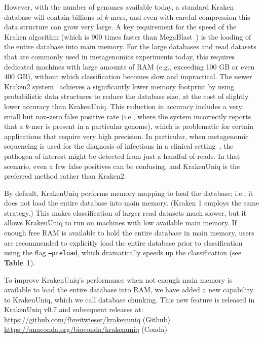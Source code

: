 \documentclass{article}
\def\code#1{\texttt{#1}}
\begin{document}
However, with the number of genomes available today, a standard Kraken database will contain billions of $k$-mers, and even with careful compression this data structure can grow very large. A key requirement for the speed of the Kraken algorithm (which is 900 times faster than MegaBlast~\cite{wood2014kraken}) is the loading of the entire database into main memory. For the large databases and read datasets that are commonly used in metagenomics experiments today, this requires dedicated machines with large amounts of RAM (e.g., exceeding 100 GB or even 400 GB), without which classification becomes slow and impractical. The newer Kraken2 system~\cite{wood2019improved} achieves a significantly lower memory footprint by using probabilistic data structures to reduce the database size, at the cost of slightly lower accuracy than KrakenUniq. This reduction in accuracy includes a very small but non-zero false positive rate (i.e., where the system incorrectly reports that a $k$-mer is present in a particular genome), which is problematic for certain applications that require very high precision. In particular, when metagenomic sequencing is used for the diagnosis of infections in a clinical setting~\cite{salzberg-pardo2016}, the pathogen of interest might be detected from just a handful of reads. In that scenario, even a few false positives can be confusing, and KrakenUniq is the preferred method rather than Kraken2.

By default, KrakenUniq performs memory mapping to load the database; i.e., it does not load the entire database into main memory. (Kraken 1 employs the same strategy.) This makes classification of larger read datasets much slower, but it allows KrakenUniq to run on machines with low available main memory. If enough free RAM is available to hold the entire database in main memory, users are recommended to explicitly load the entire database prior to classification using the flag \code{--preload}, which dramatically speeds up the classification (see \textbf{Table 1}).

To improve KrakenUniq's performance when not enough main memory is available to load the entire database into RAM, we have added a new capability to KrakenUniq, which we call database chunking. This new feature is released in KrakenUniq v0.7 and subsequent releases at:
\\
\url{https://github.com/fbreitwieser/krakenuniq} (Github) \\ \url{https://anaconda.org/bioconda/krakenuniq} (Conda)
\end{document}
